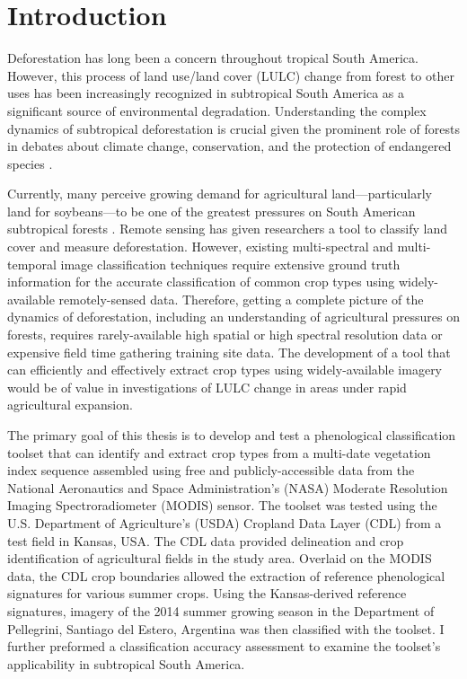 \chapter{Introduction}
\label{intro}

Deforestation has long been a concern throughout tropical South America. However, this process of land use/land cover (LULC) change from forest to other uses has been increasingly recognized in subtropical South America as a significant source of environmental degradation. Understanding the complex dynamics of subtropical deforestation is crucial given the prominent role of forests in debates about climate change, conservation, and the protection of endangered species \autocites{geist2002proximate}{zak2004do-subtropical}{bonnie2000counting}{houghton1994the-worldwide}{sala2000global}.

Currently, many perceive growing demand for agricultural land---particularly land for soybeans---to be one of the greatest pressures on South American subtropical forests \autocites{pengue2005transgenic}{grau2005agriculture}{altieri2006gm-soybean:}. Remote sensing has given researchers a tool to classify land cover and measure deforestation. However, existing multi-spectral and multi-temporal image classification techniques require extensive ground truth information for the accurate classification of common crop types using widely-available remotely-sensed data. Therefore, getting a complete picture of the dynamics of deforestation, including an understanding of agricultural pressures on forests, requires rarely-available high spatial or high spectral resolution data \autocite{senay2000using} or expensive field time gathering training site data. The development of a tool that can efficiently and effectively extract crop types using widely-available imagery would be of value in investigations of LULC change in areas under rapid agricultural expansion.

The primary goal of this thesis is to develop and test a phenological classification toolset that can identify and extract crop types from a multi-date vegetation index sequence assembled using free and publicly-accessible data from the National Aeronautics and Space Administration’s (NASA) Moderate Resolution Imaging Spectroradiometer (MODIS) sensor. The toolset was tested using the U.S. Department of Agriculture's (USDA) Cropland Data Layer (CDL) from a test field in Kansas, USA. The CDL data provided delineation and crop identification of agricultural fields in the study area. Overlaid on the MODIS data, the CDL crop boundaries allowed the extraction of reference phenological signatures for various summer crops. Using the Kansas-derived reference signatures, imagery of the 2014 summer growing season in the Department of Pellegrini, Santiago del Estero, Argentina was then classified with the toolset. I further preformed a classification accuracy assessment to examine the toolset's applicability in subtropical South America.

